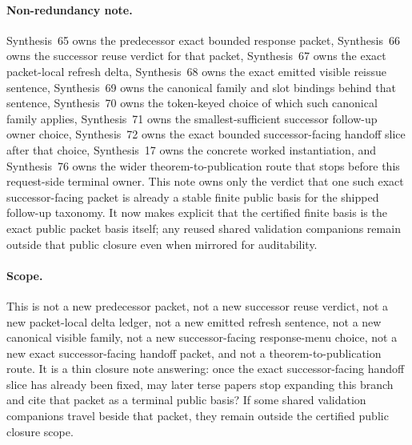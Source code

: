 \documentclass[11pt]{article}
\begin{document}
\paragraph{Non-redundancy note.}
Synthesis~65 owns the predecessor exact bounded response packet, Synthesis~66 owns the successor reuse verdict for that packet, Synthesis~67 owns the exact packet-local refresh delta, Synthesis~68 owns the exact emitted visible reissue sentence, Synthesis~69 owns the canonical family and slot bindings behind that sentence, Synthesis~70 owns the token-keyed choice of which such canonical family applies, Synthesis~71 owns the smallest-sufficient successor follow-up owner choice, Synthesis~72 owns the exact bounded successor-facing handoff slice after that choice, Synthesis~17 owns the concrete worked instantiation, and Synthesis~76 owns the wider theorem-to-publication route that stops before this request-side terminal owner.\cite{series:publicrequestresponsepackets,series:publicrequestresponsepacketcarryforward,series:publicrequestresponsepacketdeltas,series:publicrequestresponsepacketrefreshnotices,series:publicrequestresponsepacketrefreshnoticenormalforms,series:publicrequestresponsepacketrefreshnoticeselections,series:publicrequestresponsepacketrefreshresponsemenus,series:publicrequestresponsepacketrefreshresponsepackets,series:workedexample,series:theoremtopublicationspine}
This note owns only the verdict that one such exact successor-facing packet is already a stable finite public basis for the shipped follow-up taxonomy. It now makes explicit that the certified finite basis is the exact public packet basis itself; any reused shared validation companions remain outside that public closure even when mirrored for auditability.

\paragraph{Scope.}
This is not a new predecessor packet, not a new successor reuse verdict, not a new packet-local delta ledger, not a new emitted refresh sentence, not a new canonical visible family, not a new successor-facing response-menu choice, not a new exact successor-facing handoff packet, and not a theorem-to-publication route.
It is a thin closure note answering: once the exact successor-facing handoff slice has already been fixed, may later terse papers stop expanding this branch and cite that packet as a terminal public basis? If some shared validation companions travel beside that packet, they remain outside the certified public closure scope.
\end{document}
